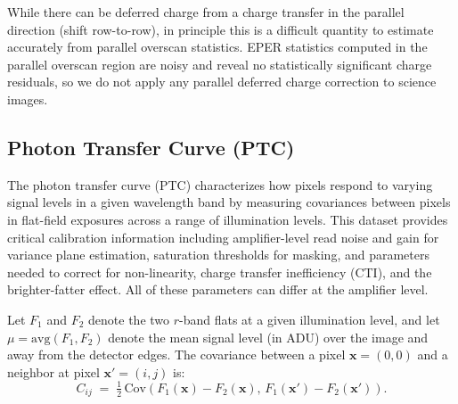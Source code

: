 While there can be deferred charge from a charge transfer in the parallel direction (shift row-to-row), in principle this is a difficult quantity to estimate accurately from parallel overscan statistics.
EPER statistics computed in the parallel overscan region are noisy and reveal no statistically significant charge residuals, so we do not apply any parallel deferred charge correction to science images.



\subsection{Photon Transfer Curve (PTC)} \label{sec:calibration-production:ptc}

The photon transfer curve (PTC) characterizes how pixels respond to varying signal levels in a given wavelength band by measuring covariances between pixels in flat-field exposures across a range of illumination levels.
This dataset provides critical calibration information including amplifier-level read noise and gain for variance plane estimation, saturation thresholds for masking, and parameters needed to correct for non-linearity, charge transfer inefficiency (CTI), and the brighter-fatter effect.
All of these parameters can differ at the amplifier level. 


Let $F_1$ and $F_2$ denote the two $r$-band flats at a given illumination level, and let $\mu = \mathrm{avg}(F_1,F_2)$ denote the mean signal level (in ADU) over the image and away from the detector edges.
The covariance between a pixel $\mathbf{x}=(0,0)$ and a neighbor at pixel $\mathbf{x}'=(i,j)$ is:
\begin{equation}
    C_{ij} \;=\; \tfrac{1}{2}\,
    \mathrm{Cov}\!\left(F_1(\mathbf{x})-F_2(\mathbf{x}),\,
                       F_1(\mathbf{x}')-F_2(\mathbf{x}')\right).
\end{equation}

